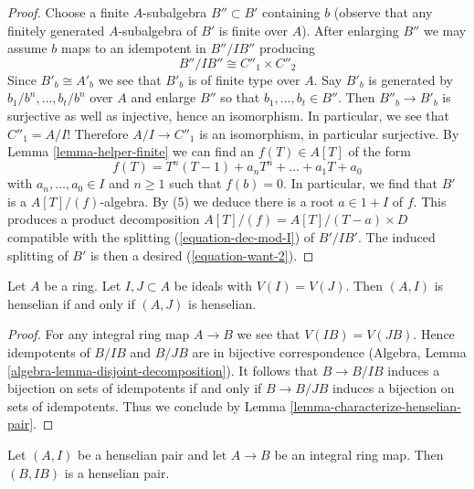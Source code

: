 \begin{proof}
\medskip\noindent
Choose a finite $A$-subalgebra $B'' \subset B'$ containing $b$
(observe that any finitely generated $A$-subalgebra of $B'$
is finite over $A$). After enlarging $B''$ we may assume
$b$ maps to an idempotent in $B''/IB''$ producing
\begin{equation}
\label{equation-again-dec-mod-I}
B''/IB'' \cong C''_1 \times C''_2
\end{equation}
Since $B'_b \cong A'_b$ we see that $B'_b$ is of finite type over $A$.
Say $B'_b$ is generated by $b_1/b^n, \ldots, b_t/b^n$ over $A$
and enlarge $B''$ so that $b_1, \ldots, b_t \in B''$. Then
$B''_b \to B'_b$ is surjective as well as injective, hence an isomorphism.
In particular, we see that $C''_1 = A/I$! Therefore $A/I \to C''_1$
is an isomorphism, in particular surjective.
By Lemma \ref{lemma-helper-finite} we can find
an $f(T) \in A[T]$ of the form
$$
f(T) = T^n(T - 1) + a_n T^n + \ldots + a_1 T + a_0
$$
with $a_n, \ldots, a_0 \in I$ and $n \ge 1$ such that $f(b) = 0$.
In particular, we find that $B'$ is a $A[T]/(f)$-algebra.
By (5) we deduce there is a root $a \in 1 + I$ of $f$.
This produces a product decomposition $A[T]/(f) = A[T]/(T - a) \times D$
compatible with the splitting (\ref{equation-dec-mod-I}) of $B'/IB'$.
The induced splitting of $B'$ is then a desired (\ref{equation-want-2}).
\end{proof}

\begin{lemma}
\label{lemma-change-ideal-henselian-pair}
Let $A$ be a ring. Let $I, J \subset A$ be ideals with $V(I) = V(J)$.
Then $(A, I)$ is henselian if and only if $(A, J)$ is henselian.
\end{lemma}

\begin{proof}
For any integral ring map $A \to B$ we see that $V(IB) = V(JB)$.
Hence idempotents of $B/IB$ and $B/JB$ are in bijective correspondence
(Algebra, Lemma \ref{algebra-lemma-disjoint-decomposition}).
It follows that $B \to B/IB$ induces a bijection on sets of
idempotents if and only if $B \to B/JB$ induces a bijection on sets
of idempotents. Thus we conclude by
Lemma \ref{lemma-characterize-henselian-pair}.
\end{proof}

\begin{lemma}
\label{lemma-integral-over-henselian-pair}
Let $(A, I)$ be a henselian pair and let $A \to B$ be an integral ring
map. Then $(B, IB)$ is a henselian pair.
\end{lemma}

